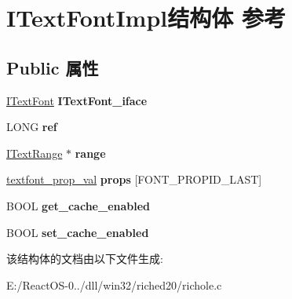 \hypertarget{struct_i_text_font_impl}{}\section{I\+Text\+Font\+Impl结构体 参考}
\label{struct_i_text_font_impl}
\subsection*{Public 属性}
\begin{DoxyCompactItemize}
\item 
\mbox{\label{struct_i_text_font_impl_a444bfa1922c17c8b018945c362a06f3a}} 
\hyperlink{interface_i_text_font}{I\+Text\+Font} {\bfseries I\+Text\+Font\+\_\+iface}
\item 
\mbox{\label{struct_i_text_font_impl_ac806133626ed444f1e26e716ec2c3c02}} 
L\+O\+NG {\bfseries ref}
\item 
\mbox{\label{struct_i_text_font_impl_ae61411c1a4168777cd671c88fc30b76c}} 
\hyperlink{interface_i_text_range}{I\+Text\+Range} $\ast$ {\bfseries range}
\item 
\mbox{\label{struct_i_text_font_impl_a18dc9a9c592c61bbcd357886812b0f5e}} 
\hyperlink{uniontextfont__prop__val}{textfont\+\_\+prop\+\_\+val} {\bfseries props} \mbox{[}F\+O\+N\+T\+\_\+\+P\+R\+O\+P\+I\+D\+\_\+\+L\+A\+ST\mbox{]}
\item 
\mbox{\label{struct_i_text_font_impl_ae0fbdf7d9b210d2f85bb2931d83d42ee}} 
B\+O\+OL {\bfseries get\+\_\+cache\+\_\+enabled}
\item 
\mbox{\label{struct_i_text_font_impl_a7139930c2af9824cfe380823dc09963d}} 
B\+O\+OL {\bfseries set\+\_\+cache\+\_\+enabled}
\end{DoxyCompactItemize}


该结构体的文档由以下文件生成\+:\begin{DoxyCompactItemize}
\item 
E\+:/\+React\+O\+S-\/0../dll/win32/riched20/richole.\+c\end{DoxyCompactItemize}

